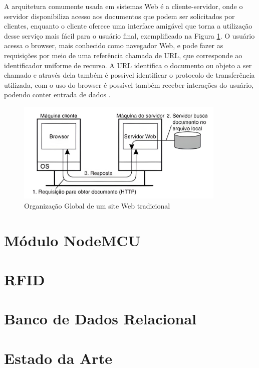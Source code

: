 A arquitetura comumente usada em sistemas Web é a cliente-servidor, onde o servidor disponibiliza acesso aos documentos que podem ser solicitados por clientes, enquanto o cliente oferece uma interface amigável que torna a utilização desse serviço mais fácil para o usuário final, exemplificado na Figura \ref{fig:arquitetura-cliente-servidor}. O usuário acessa o browser, mais conhecido como navegador Web, e pode fazer as requisições por meio de uma referência chamada de \acf{URL}, que corresponde ao identificador uniforme de recurso. A URL identifica o documento ou objeto a ser chamado e através dela também é possível identificar o protocolo de transferência utilizada, com o uso do browser é possível também receber interações do usuário, podendo conter entrada de dados \citep{tanenbaum2008sistemas}.

\begin{figure}[ht]
    \centering
    \includegraphics[width=10cm]{images/arquitetura-cliente-servidor.png}
    \caption{Organização Global de um site Web tradicional}
    \label{fig:arquitetura-cliente-servidor}
\end{figure}



\section{Módulo NodeMCU}%
    
\section{RFID}%

\section{Banco de Dados Relacional}%
    
\section{Estado da Arte}%